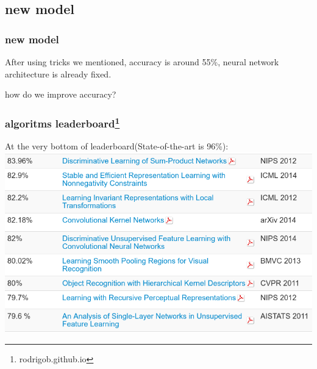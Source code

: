 \documentclass{beamer}
\begin{document}
\subsection{new model}
\begin{frame}
\frametitle{new model}
After using tricks we mentioned, accuracy is around 55\%, 
neural network architecture is already fixed. \\
\phantom{dsf}
\begin{huge}
how do we improve accuracy?
\end{huge}
\end{frame}

\begin{frame}
\frametitle{algoritms leaderboard\footnote{rodrigob.github.io}}
At the very bottom of leaderboard(State-of-the-art is 96\%):
\includegraphics[width=\textwidth]{rank.png}
\end{frame}
\end{document}
